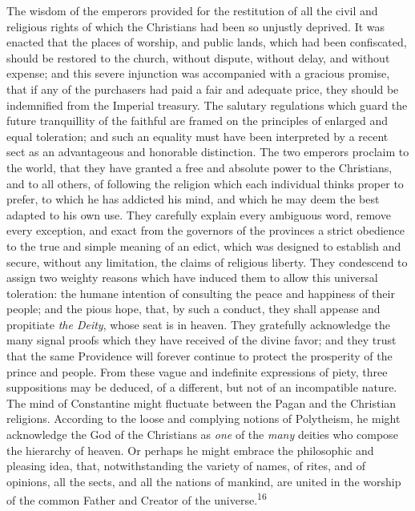 
The wisdom of the emperors provided for the restitution of all the
civil and religious rights of which the Christians had been so unjustly
deprived. It was enacted that the places of worship, and public lands,
which had been confiscated, should be restored to the church, without
dispute, without delay, and without expense; and this severe injunction
was accompanied with a gracious promise, that if any of the purchasers
had paid a fair and adequate price, they should be indemnified from the
Imperial treasury. The salutary regulations which guard the future
tranquillity of the faithful are framed on the principles of enlarged
and equal toleration; and such an equality must have been interpreted
by a recent sect as an advantageous and honorable distinction. The two
emperors proclaim to the world, that they have granted a free and
absolute power to the Christians, and to all others, of following the
religion which each individual thinks proper to prefer, to which he has
addicted his mind, and which he may deem the best adapted to his own
use. They carefully explain every ambiguous word, remove every
exception, and exact from the governors of the provinces a strict
obedience to the true and simple meaning of an edict, which was
designed to establish and secure, without any limitation, the claims of
religious liberty. They condescend to assign two weighty reasons which
have induced them to allow this universal toleration: the humane
intention of consulting the peace and happiness of their people; and
the pious hope, that, by such a conduct, they shall appease and
propitiate \textit{the Deity}, whose seat is in heaven. They gratefully
acknowledge the many signal proofs which they have received of the
divine favor; and they trust that the same Providence will forever
continue to protect the prosperity of the prince and people. From these
vague and indefinite expressions of piety, three suppositions may be
deduced, of a different, but not of an incompatible nature. The mind of
Constantine might fluctuate between the Pagan and the Christian
religions. According to the loose and complying notions of Polytheism,
he might acknowledge the God of the Christians as \textit{one} of the \textit{many}
deities who compose the hierarchy of heaven. Or perhaps he might
embrace the philosophic and pleasing idea, that, notwithstanding the
variety of names, of rites, and of opinions, all the sects, and all the
nations of mankind, are united in the worship of the common Father and
Creator of the universe.\textsuperscript{16}

